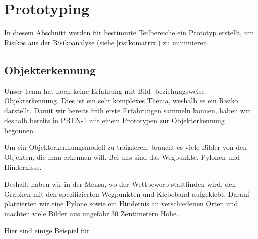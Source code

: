 \documentclass[../main.tex]{subfiles}
\begin{document}
\newpage
\section{Prototyping}

In diesem Abschnitt werden für bestimmte Teilbereiche ein Prototyp erstellt,
um Risikos aus der Risikoanalyse (siehe \ref{risikomatrix}) zu minimieren.

\subsection{Objekterkennung}

Unser Team hat noch keine Erfahrung mit Bild- beziehungsweise Objekterkennung.
Dies ist ein sehr komplexes Thema, weshalb es ein Risiko darstellt.
Damit wir bereits früh erste Erfahrungen sammeln können, haben wir deshalb bereits in PREN-1 mit einem Prototypen zur Objekterkennung begonnen.

Um ein Objekterkennungsmodell zu trainieren, braucht es viele Bilder von den Objekten, die man erkennen will. Bei uns sind das Wegpunkte, Pylonen und Hindernisse.

Deshalb haben wir in der Mensa, wo der Wettbewerb stattfinden wird, den Graphen mit den spezifizierten Wegpunkten und Klebeband aufgeklebt. Darauf platzierten wir eine Pylone sowie ein Hindernis an verschiedenen Orten und machten viele Bilder aus ungefähr 30 Zentimetern Höhe.

Hier sind einige Beispiel für
\end{document}
